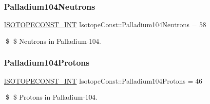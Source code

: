 \subsubsection{\texorpdfstring{Palladium104\+Neutrons}{Palladium104Neutrons}}
{\footnotesize\ttfamily \mbox{\hyperlink{group___isotope_const-_macros_ga5f18360b3e99483a35c32d789e62621c}{I\+S\+O\+T\+O\+P\+E\+C\+O\+N\+S\+T\+\_\+\+I\+NT}} Isotope\+Const\+::\+Palladium104\+Neutrons = 58}

\$ \$ Neutrons in Palladium-\/104. \mbox{\label{group___isotope_const-_palladium-_pd104_gaeca5e9ed31a18f28ced9d94c4553602c}} 
\subsubsection{\texorpdfstring{Palladium104\+Protons}{Palladium104Protons}}
{\footnotesize\ttfamily \mbox{\hyperlink{group___isotope_const-_macros_ga5f18360b3e99483a35c32d789e62621c}{I\+S\+O\+T\+O\+P\+E\+C\+O\+N\+S\+T\+\_\+\+I\+NT}} Isotope\+Const\+::\+Palladium104\+Protons = 46}

\$ \$ Protons in Palladium-\/104. 